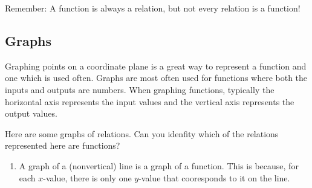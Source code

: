\documentclass{ximera}
\begin{document}
\begin{remark}
Remember: A function is always a relation, but not every relation is a function!
\end{remark}

\subsection{Graphs}
Graphing points on a coordinate plane is a great way to represent a function and one which is used often.  Graphs are most often used for functions where both the inputs and outputs are numbers.  When graphing functions, typically the horizontal axis represents the input values and the vertical axis represents the output values.

\begin{example}
Here are some graphs of relations.  Can you idenfity which of the relations represented here are functions?

	\begin{image}

\hspace{15px}

	
\end{image}


\begin{explanation}
\begin{enumerate}[label=\alph*.]
\item
A graph of a (nonvertical) line is a graph of a function.  This is because, for each $x$-value, there is only one $y$-value that cooresponds to it on the line.


\end{enumerate}
\end{explanation}
\end{example}
\end{document}
